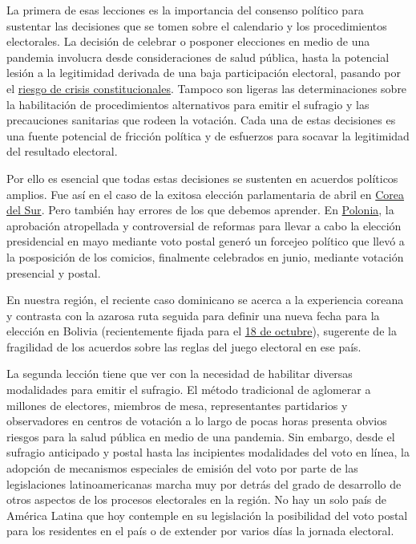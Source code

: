 La primera de esas lecciones es la importancia del consenso político
para sustentar las decisiones que se tomen sobre el calendario y los
procedimientos electorales. La decisión de celebrar o posponer
elecciones en medio de una pandemia involucra desde consideraciones de
salud pública, hasta la potencial lesión a la legitimidad derivada de
una baja participación electoral, pasando por el
\href{https://www.idea.int/sites/default/files/publications/managing-elections-during-covid-19-pandemic.pdf}{riesgo
de crisis constitucionales}. Tampoco son ligeras las determinaciones
sobre la habilitación de procedimientos alternativos para emitir el
sufragio y las precauciones sanitarias que rodeen la votación. Cada una
de estas decisiones es una fuente potencial de fricción política y de
esfuerzos para socavar la legitimidad del resultado electoral.

Por ello es esencial que todas estas decisiones se sustenten en acuerdos
políticos amplios. Fue así en el caso de la exitosa elección
parlamentaria de abril en
\href{https://www.france24.com/es/20200415-corea-sur-elecciones-moon-jaein-coronavirus}{Corea
del Sur}. Pero también hay errores de los que debemos aprender. En
\href{https://www.elmundo.es/internacional/2020/07/12/5f0b616521efa0ef7b8b469c.html}{Polonia},
la aprobación atropellada y controversial de reformas para llevar a cabo
la elección presidencial en mayo mediante voto postal generó un forcejeo
político que llevó a la posposición de los comicios, finalmente
celebrados en junio, mediante votación presencial y postal.

En nuestra región, el reciente caso dominicano se acerca a la
experiencia coreana y contrasta con la azarosa ruta seguida para definir
una nueva fecha para la elección en Bolivia (recientemente fijada para
el
\href{https://cnnespanol.cnn.com/2020/08/13/el-tse-de-bolivia-anuncia-el-18-de-octubre-como-fecha-definitiva-de-las-elecciones-generales/}{18
de octubre}), sugerente de la fragilidad de los acuerdos sobre las
reglas del juego electoral en ese país.

La segunda lección tiene que ver con la necesidad de habilitar diversas
modalidades para emitir el sufragio. El método tradicional de aglomerar
a millones de electores, miembros de mesa, representantes partidarios y
observadores en centros de votación a lo largo de pocas horas presenta
obvios riesgos para la salud pública en medio de una pandemia. Sin
embargo, desde el sufragio anticipado y postal hasta las incipientes
modalidades del voto en línea, la adopción de mecanismos especiales de
emisión del voto por parte de las legislaciones latinoamericanas marcha
muy por detrás del grado de desarrollo de otros aspectos de los procesos
electorales en la región. No hay un solo país de América Latina que hoy
contemple en su legislación la posibilidad del voto postal para los
residentes en el país o de extender por varios días la jornada
electoral.

